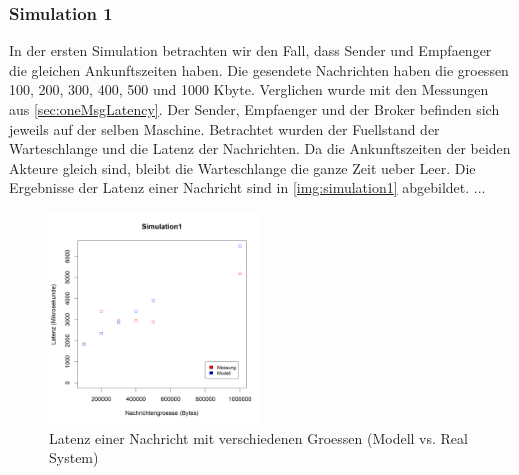 \subsubsection{Simulation 1} 
\label{sec:rmqSimulation1}
In der ersten Simulation betrachten wir den Fall, dass Sender und Empfaenger die gleichen Ankunftszeiten haben. Die gesendete Nachrichten haben die groessen 100, 200, 300, 400, 500 und 1000 Kbyte. Verglichen wurde mit den Messungen aus \autoref{sec:oneMsgLatency}. Der Sender, Empfaenger und der Broker befinden sich jeweils auf der selben Maschine. Betrachtet wurden der Fuellstand der Warteschlange und die Latenz der Nachrichten. 
Da die Ankunftszeiten der beiden Akteure gleich sind, bleibt die Warteschlange die ganze Zeit ueber Leer. Die Ergebnisse der Latenz einer Nachricht sind in \autoref{img:simulation1} abgebildet. ...

\begin{figure}
\center
  \includegraphics[width=0.5\textwidth]{images/modelSimulationResults/simulation1.png}
  \caption{Latenz einer Nachricht mit verschiedenen Groessen (Modell vs. Real System)}
  \label{img:simulation1}
\end{figure}

